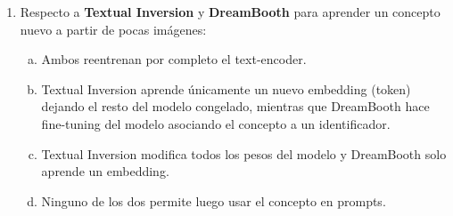 \documentclass{article}
\begin{document}
\begin{enumerate}[{\bf 1.}]
	\item Respecto a \textbf{Textual Inversion} y \textbf{DreamBooth} para aprender un concepto nuevo a partir de pocas imágenes:
	      \begin{enumerate}[(a)]
		      \item Ambos reentrenan por completo el text-encoder.
		      \item Textual Inversion aprende únicamente un nuevo embedding (token) dejando el resto del modelo congelado, mientras que DreamBooth hace fine-tuning del modelo asociando el concepto a un identificador.
		      \item Textual Inversion modifica todos los pesos del modelo y DreamBooth solo aprende un embedding.
		      \item Ninguno de los dos permite luego usar el concepto en prompts.
	      \end{enumerate}

\end{enumerate}
\end{document}
